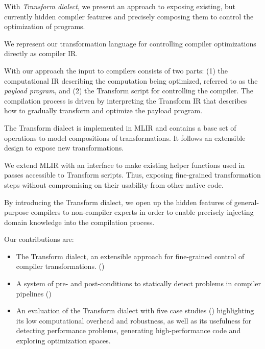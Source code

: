 \documentclass[screen,nonacm,authorversion]{acmart}
\begin{document}
With \emph{Transform dialect}, we present an approach to exposing existing, but currently hidden compiler features and precisely composing them to control the optimization of programs.

We represent our transformation language for controlling compiler optimizations directly as compiler IR.






With our approach the input to compilers consists of two parts: (1) the computational IR %
describing the computation being optimized, referred to as the \emph{payload program}, and (2) the Transform script for controlling the compiler. The compilation process is driven by interpreting the Transform IR that describes how to gradually transform and optimize the payload program.

The Transform dialect is implemented in MLIR and contains a base set of operations to model compositions of transformations. It follows an extensible design to expose new transformations.

We extend MLIR with an interface to make existing helper functions used in passes accessible to Transform scripts.
Thus, exposing fine-grained transformation steps without compromising on their usability from other native code.



By introducing the Transform dialect, we open up the hidden features of general-purpose compilers to non-compiler experts in order to enable precisely injecting domain knowledge into the compilation process.






Our contributions are:
\begin{itemize}
    \item The Transform dialect, an extensible approach for fine-grained control of compiler transformations. ()
    \item A system of pre- and post-conditions to statically detect problems in compiler pipelines ()
    \item An evaluation of the Transform dialect with five case studies () highlighting its low computational overhead and robustness, as well as its usefulness for detecting performance problems, generating high-performance code and exploring optimization spaces.
\end{itemize}
\end{document}
